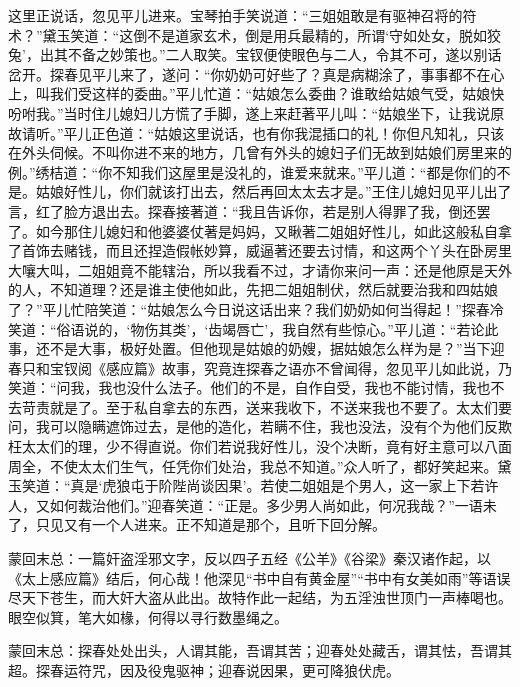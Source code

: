\begin{parag}
    这里正说话，忽见平儿进来。宝琴拍手笑说道：“三姐姐敢是有驱神召将的符术？”黛玉笑道：“这倒不是道家玄术，倒是用兵最精的，所谓‘守如处女，脱如狡兔’，出其不备之妙策也。”二人取笑。宝钗便使眼色与二人，令其不可，遂以别话岔开。探春见平儿来了，遂问：“你奶奶可好些了？真是病糊涂了，事事都不在心上，叫我们受这样的委曲。”平儿忙道：“姑娘怎么委曲？谁敢给姑娘气受，姑娘快吩咐我。”当时住儿媳妇儿方慌了手脚，遂上来赶著平儿叫：“姑娘坐下，让我说原故请听。”平儿正色道：“姑娘这里说话，也有你我混插口的礼！你但凡知礼，只该在外头伺候。不叫你进不来的地方，几曾有外头的媳妇子们无故到姑娘们房里来的例。”绣桔道：“你不知我们这屋里是没礼的，谁爱来就来。”平儿道：“都是你们的不是。姑娘好性儿，你们就该打出去，然后再回太太去才是。”王住儿媳妇见平儿出了言，红了脸方退出去。探春接著道：“我且告诉你，若是别人得罪了我，倒还罢了。如今那住儿媳妇和他婆婆仗著是妈妈，又瞅著二姐姐好性儿，如此这般私自拿了首饰去赌钱，而且还捏造假帐妙算，威逼著还要去讨情，和这两个丫头在卧房里大嚷大叫，二姐姐竟不能辖治，所以我看不过，才请你来问一声：还是他原是天外的人，不知道理？还是谁主使他如此，先把二姐姐制伏，然后就要治我和四姑娘了？”平儿忙陪笑道：“姑娘怎么今日说这话出来？我们奶奶如何当得起！”探春冷笑道：“俗语说的，‘物伤其类’，‘齿竭唇亡’，我自然有些惊心。”平儿道：“若论此事，还不是大事，极好处置。但他现是姑娘的奶嫂，据姑娘怎么样为是？”当下迎春只和宝钗阅《感应篇》故事，究竟连探春之语亦不曾闻得，忽见平儿如此说，乃笑道：“问我，我也没什么法子。他们的不是，自作自受，我也不能讨情，我也不去苛责就是了。至于私自拿去的东西，送来我收下，不送来我也不要了。太太们要问，我可以隐瞒遮饰过去，是他的造化，若瞒不住，我也没法，没有个为他们反欺枉太太们的理，少不得直说。你们若说我好性儿，没个决断，竟有好主意可以八面周全，不使太太们生气，任凭你们处治，我总不知道。”众人听了，都好笑起来。黛玉笑道：“真是‘虎狼屯于阶陛尚谈因果’。若使二姐姐是个男人，这一家上下若许人，又如何裁治他们。”迎春笑道：“正是。多少男人尚如此，何况我哉？”一语未了，只见又有一个人进来。正不知道是那个，且听下回分解。
\end{parag}


\begin{parag}
    \begin{note}蒙回末总：一篇奸盗淫邪文字，反以四子五经《公羊》《谷梁》秦汉诸作起，以《太上感应篇》结后，何心哉！他深见“书中自有黄金屋”“书中有女美如雨”等语误尽天下苍生，而大奸大盗从此出。故特作此一起结，为五淫浊世顶门一声棒喝也。眼空似箕，笔大如椽，何得以寻行数墨绳之。\end{note}
\end{parag}


\begin{parag}
    \begin{note}蒙回末总：探春处处出头，人谓其能，吾谓其苦；迎春处处藏舌，谓其怯，吾谓其超。探春运符咒，因及役鬼驱神；迎春说因果，更可降狼伏虎。\end{note}
\end{parag}

